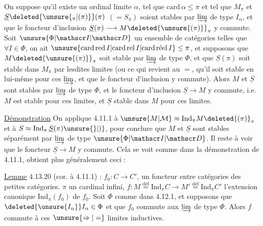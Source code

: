 On suppose qu'il existe un ordinal limite $\alpha$, tel que $\mathrm{card}\,\alpha\leq\pi$ et tel que $M_\pi$ et $\underline S\deleted{\unsure{{}_{\pi}|(\pi)}}(\pi)$ $(=S_\pi)$ soient stables par $\varinjlim$ de type $I_\alpha$,  et que le foncteur d'inclusion $\underline S(\pi)\longrightarrow M\deleted{\unsure{(\pi)}}_\pi$ y commute. Soit $\unsure{\Phi|\mathscr I|\mathscr D}$ un ensemble de catégories  telles que $\forall I\in\Phi$, on ait $\unsure{\mathrm{card}\,\mathrm{red}\,I|\mathrm{card}\,\mathrm{rel}\,I|\mathrm{card}\,\text{réel}\,I}\leq\pi$, et supposons que $M\deleted{\unsure{(\pi)}}_\pi$   soit stable par $\varinjlim$ de type $\Phi$, et que $\underline S(\pi)$ soit stable dans $M_\pi$ par lesdites limites (ou ce qui revient au $=$, qu'il soit stable en lui-même pour ces $\varinjlim$, et que le foncteur d'inclusion y commute). Alors $M$ et $\underline S$ sont stables par $\varinjlim$ de type $\Phi$, et le foncteur d'inclusion $\underline S\longrightarrow M$ y commute, i.e. $M$ est stable pour ces limites, et $\underline S$ stable dans $M$ pour ces \unsure{$\Rightarrow$|$=$} limites.



\uline{Démonstration} On applique 4.11.1   à $\unsure{M|\mathcal M}\approx\mathrm{Ind}_\pi M\deleted{(\pi)}_\pi$ et à $S\approx\mathrm{Ind}_\pi\,\underline S(\pi)\unsure{\}|)}$, pour conclure que $M$ et $\underline S$ sont stables séparément par $\varinjlim$ de type $\unsure{\Phi|\mathscr I|\mathscr D}$. Il reste à voir que le foncteur $\underline S\longrightarrow M$ y commute. Cela se voit comme dans la démonstration de 4.11.1,  obtient plus généralement ceci :

\uline{Lemme} 4.13.20 (cor. à 4.11.1) :  $f_0:C\longrightarrow C'$, un foncteur entre catégories  des petites catégories. $\pi$ un cardinal infini, $f:M\overset{\text{déf}}{=}\mathrm{Ind}_\pi C\longrightarrow M'\overset{\text{déf}}{=}\mathrm{Ind}_\pi C'$
l'extension canonique $\mathrm{Ind}_\pi(f_0)$ de $f_0$. Soit $\Phi$  comme dans 4.12.1, et supposons que $\deleted{\unsure{I_\alpha}}I_\alpha\in\Phi$ et que $f_0$ commute aux $\varinjlim$ de type $\Phi$. Alors $f$ commute à ces $\unsure{\Rightarrow|=}$ limites inductives.

